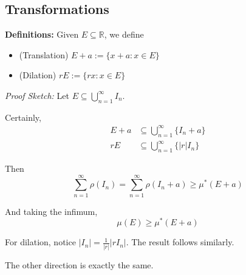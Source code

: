 \documentclass[12pt]{report}
\newcommand{\R}{\mathbb{R}}
\newcommand{\abs}[1]{\left\vert #1 \right\vert}
\newcommand{\M}{\mathcal{M}}
\newcommand{\sub}{\subseteq}
\newenvironment*{tbox}[2][gray]{
    \begin{tcolorbox}[
        parbox=false,
        colback=#1!5!white,
        colframe=#1!75!black,
        breakable,
        title={#2}
    ]}
    {\end{tcolorbox}}
\begin{document}
\subsection*{Transformations}

\textbf{Definitions:} Given $E \sub \R$, we define 
\begin{itemize}
    \item (Translation) $E + a := \{x + a: x \in E\}$
    \item (Dilation) $rE := \{rx: x \in E\}$
\end{itemize}

\begin{tbox}{\textbf{Lemma:} For the Lebesgue outer measure and $E \in \M$, 
    \begin{enumerate}
        \item $\mu^*(E + a) = \mu^*(E)$
        \item $\mu^*(rE) = \abs{r}\mu^*(E)$
    \end{enumerate}}
    \emph{Proof Sketch:} Let $E \sub \bigcup_{n=1}^\infty I_n$. 

    Certainly, 
    \begin{align*}
        E + a &\sub \bigcup_{n=1}^\infty \{I_n + a\}\\ 
        rE &\sub \bigcup_{n=1}^\infty \{\abs{r}I_n\}
    \end{align*}

    Then
    \[\sum_{n=1}^{\infty} \rho(I_n) = \sum_{n=1}^\infty \rho(I_n+ a) \geq \mu^*(E + a)\]

    And taking the infimum,
    \[\mu(E) \geq \mu^*(E + a)\]

    For dilation, notice $\abs{I_n} = \frac{1}{\abs{r}} \abs{rI_n}$. The result follows similarly. 

    The other direction is exactly the same. 
\end{tbox}
\end{document}
